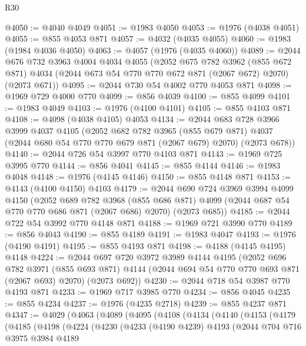 \begin{lexlean}{R30}
\begin{coremodule}
@4050 := @4040 @4049
@4051 := @1983 @4050
@4053 := @1976 (@4038 @4051)
@4055 := @855 @4053 @871
@4057 := @4032 (@4035 @4055)
@4060 := @1983 (@1984 @4036 @4050)
@4063 := @4057 (@1976 (@4035 @4060))
@4089 := @2044
    @676
    @732
    @3963
    @4004
    @4034
    @4055
    (@2052
      @675
      @782
      @3962
      (@855 @672 @871)
      @4034
      (@2044 @673 @54 @770 @770 @672 @871 (@2067 @672) @2070)
      (@2073 @671))
@4095 := @2044 @730 @54 @4002 @770 @4053 @871
@4098 := @1969 @729 @4000 @770
@4099 := @856 @4039
@4100 := @855 @4099
@4101 := @1983 @4049
@4103 := @1976 (@4100 @4101)
@4105 := @855 @4103 @871
@4108 := @4098 (@4038 @4105) @4053
@4134 := @2044
    @683
    @728
    @3966
    @3999
    @4037
    @4105
    (@2052
      @682
      @782
      @3965
      (@855 @679 @871)
      @4037
      (@2044 @680 @54 @770 @770 @679 @871 (@2067 @679) @2070)
      (@2073 @678))
@4140 := @2044 @726 @54 @3997 @770 @4103 @871
@4143 := @1969 @725 @3995 @770
@4144 := @856 @4041
@4145 := @855 @4144
@4146 := @1983 @4048
@4148 := @1976 (@4145 @4146)
@4150 := @855 @4148 @871
@4153 := @4143 (@4100 @4150) @4103
@4179 := @2044
    @690
    @724
    @3969
    @3994
    @4099
    @4150
    (@2052
      @689
      @782
      @3968
      (@855 @686 @871)
      @4099
      (@2044 @687 @54 @770 @770 @686 @871 (@2067 @686) @2070)
      (@2073 @685))
@4185 := @2044 @722 @54 @3992 @770 @4148 @871
@4188 := @1969 @721 @3990 @770
@4189 := @856 @4043
@4190 := @855 @4189
@4191 := @1983 @4047
@4193 := @1976 (@4190 @4191)
@4195 := @855 @4193 @871
@4198 := @4188 (@4145 @4195) @4148
@4224 := @2044
    @697
    @720
    @3972
    @3989
    @4144
    @4195
    (@2052
      @696
      @782
      @3971
      (@855 @693 @871)
      @4144
      (@2044 @694 @54 @770 @770 @693 @871 (@2067 @693) @2070)
      (@2073 @692))
@4230 := @2044 @718 @54 @3987 @770 @4193 @871
@4233 := @1969 @717 @3985 @770
@4234 := @856 @4045
@4235 := @855 @4234
@4237 := @1976 (@4235 @2718)
@4239 := @855 @4237 @871
@4347 := @4029
    (@4063
      (@4089
        (@4095
          (@4108
            (@4134
              (@4140
                (@4153
                  (@4179
                    (@4185
                      (@4198
                        (@4224
                          (@4230
                            (@4233
                              (@4190 @4239)
                              @4193
                              (@2044
                                @704
                                @716
                                @3975
                                @3984
                                @4189

\end{coremodule}
\end{lexlean}
